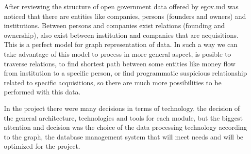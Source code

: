 \documentclass[12pt,a4paper,titlepage]{article}
\begin{document}
After reviewing the structure of open government data offered by egov.md was noticed that there are entities like companies, persons (founders and owners) and institutions. Between persons and companies exist relations (founding and ownership), also exist between institution and companies that are acquisitions. This is a perfect model for graph representation of data. In such a way we can take advantage of this model to process in more general aspect, is posible to traverse relations, to find shortest path between some entities like money flow from institution to a specific person, or find programmatic suspicious relationship related to specific acquisitions, so there are much more possibilities to be performed with this data.

In the project there were many decisions in terms of technology, the decision of the general architecture, technologies and tools for each module, but the biggest attention and decision was the choice of the data processing technology according to the graph, the database management system that will meet needs and will be optimized for the project.

\newpage
\end{document}
